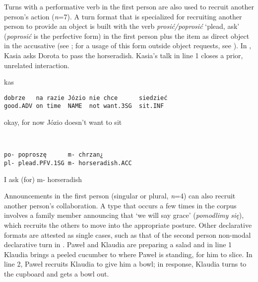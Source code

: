 \documentclass[output=paper]{langsci/langscibook}
\begin{document}
Turns with a performative verb in the first person are also used to recruit another person’s action (\textit{n}=7).  A turn format that is specialized for recruiting another person to provide an object is built with the verb \textit{prosić/poprosić} ‘plead, ask' (\textit{poprosić} is the perfective form) in the first person plus the item as direct object in the accusative (see \citealt{ogiermann2015}; for a usage of this form outside object requests, see \citealt{Weidner2015}).  In , Kasia asks Dorota to pass the horseradish. Kasia's talk in line 1 closes a prior, unrelated interaction.

\vspace{2mm}
%
\begin{transbox}{1}{kas}
\begin{verbatim}
dobrze   na razie Józio nie chce      siedzieć
good.ADV on time  NAME  not want.3SG  sit.INF
\end{verbatim}
okay, for now Józio doesn’t want to sit
\end{transbox}
%
\begin{mdframednoverticalspace}[style=firstfoc]
\begin{transbox}{2}{~}
\begin{verbatim}
po- poproszę      m- chrzan¿
pl- plead.PFV.1SG m- horseradish.ACC
\end{verbatim}
I ask (for) m- horseradish
\end{transbox}
\end{mdframednoverticalspace}
%
\begin{mdframednoverticalspace}[style=secondfoc]
\end{mdframednoverticalspace}

Announcements in the first person (singular or plural, \textit{n}=4) can also recruit another person’s collaboration. A type that occurs a few times in the corpus involves a family member announcing that `we will say grace' (\textit{pomodlimy się}), which recruits the others to move into the appropriate posture.  Other declarative formats are attested as single cases, such as that of the second person non-modal declarative turn in . Paweł and Klaudia are preparing a salad and in line 1 Klaudia brings a peeled cucumber to where Paweł is standing, for him to slice.  In line 2, Paweł recruits Klaudia to give him a bowl; in response, Klaudia turns to the cupboard and gets a bowl out.
\end{document}
